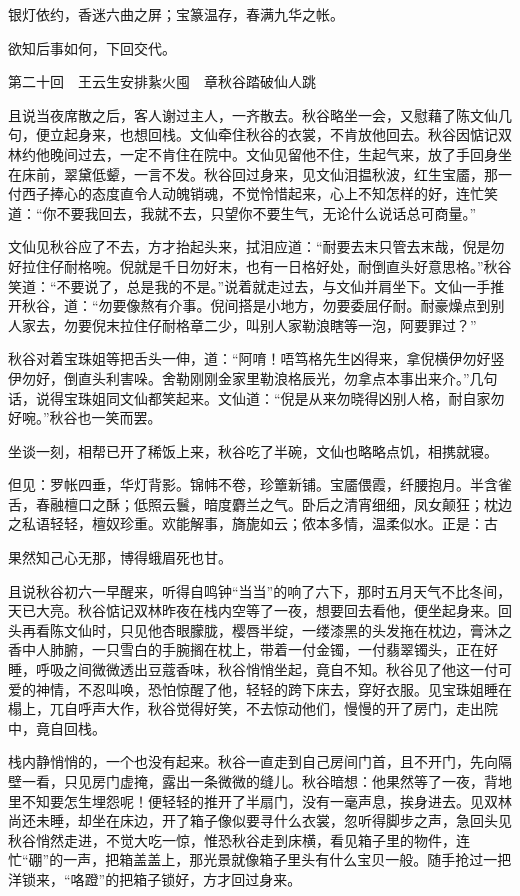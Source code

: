 \documentclass[12pt,UTF8]{ctexbook}
\begin{document}
{{{银灯依约，香迷六曲之屏；宝篆温存，春满九华之帐。

欲知后事如何，下回交代。





第二十回　王云生安排紥火囤　章秋谷踏破仙人跳





且说当夜席散之后，客人谢过主人，一齐散去。秋谷略坐一会，又慰藉了陈文仙几句，便立起身来，也想回栈。文仙牵住秋谷的衣裳，不肯放他回去。秋谷因惦记双林约他晚间过去，一定不肯住在院中。文仙见留他不住，生起气来，放了手回身坐在床前，翠黛低颦，一言不发。秋谷回过身来，见文仙泪揾秋波，红生宝靥，那一付西子捧心的态度直令人动魄销魂，不觉怜惜起来，心上不知怎样的好，连忙笑道：“你不要我回去，我就不去，只望你不要生气，无论什么说话总可商量。”

文仙见秋谷应了不去，方才抬起头来，拭泪应道：“耐要去末只管去末哉，倪是勿好拉住仔耐格啘。倪就是千日勿好末，也有一日格好处，耐倒直头好意思格。”秋谷笑道：“不要说了，总是我的不是。”说着就走过去，与文仙并肩坐下。文仙一手推开秋谷，道：“勿要像熬有介事。倪间搭是小地方，勿要委屈仔耐。耐豪燥点到别人家去，勿要倪末拉住仔耐格章二少，叫别人家勒浪瞎等一泡，阿要罪过？”

秋谷对着宝珠姐等把舌头一伸，道：“阿唷！唔笃格先生凶得来，拿倪横伊勿好竖伊勿好，倒直头利害哚。舍勒刚刚金家里勒浪格辰光，勿拿点本事出来介。”几句话，说得宝珠姐同文仙都笑起来。文仙道：“倪是从来勿晓得凶别人格，耐自家勿好啘。”秋谷也一笑而罢。

坐谈一刻，相帮已开了稀饭上来，秋谷吃了半碗，文仙也略略点饥，相携就寝。

但见：罗帐四垂，华灯背影。锦帏不卷，珍簟新铺。宝靥偎霞，纤腰抱月。半含雀舌，春融檀口之酥；低照云鬟，暗度麝兰之气。卧后之清宵细细，凤女颠狂；枕边之私语轻轻，檀奴珍重。欢能解事，旖旎如云；侬本多情，温柔似水。正是：古

果然知己心无那，博得蛾眉死也甘。

且说秋谷初六一早醒来，听得自鸣钟“当当”的响了六下，那时五月天气不比冬间，天已大亮。秋谷惦记双林昨夜在栈内空等了一夜，想要回去看他，便坐起身来。回头再看陈文仙时，只见他杏眼朦胧，樱唇半绽，一缕漆黑的头发拖在枕边，膏沐之香中人肺腑，一只雪白的手腕搁在枕上，带着一付金镯，一付翡翠镯头，正在好睡，呼吸之间微微透出豆蔻香味，秋谷悄悄坐起，竟自不知。秋谷见了他这一付可爱的神情，不忍叫唤，恐怕惊醒了他，轻轻的跨下床去，穿好衣服。见宝珠姐睡在榻上，兀自呼声大作，秋谷觉得好笑，不去惊动他们，慢慢的开了房门，走出院中，竟自回栈。

栈内静悄悄的，一个也没有起来。秋谷一直走到自己房间门首，且不开门，先向隔壁一看，只见房门虚掩，露出一条微微的缝儿。秋谷暗想：他果然等了一夜，背地里不知要怎生埋怨呢！便轻轻的推开了半扇门，没有一毫声息，挨身进去。见双林尚还未睡，却坐在床边，开了箱子像似要寻什么衣裳，忽听得脚步之声，急回头见秋谷悄然走进，不觉大吃一惊，惟恐秋谷走到床横，看见箱子里的物件，连忙“硼”的一声，把箱盖盖上，那光景就像箱子里头有什么宝贝一般。随手抢过一把洋锁来，“咯蹬”的把箱子锁好，方才回过身来。

}}}
\end{document}
